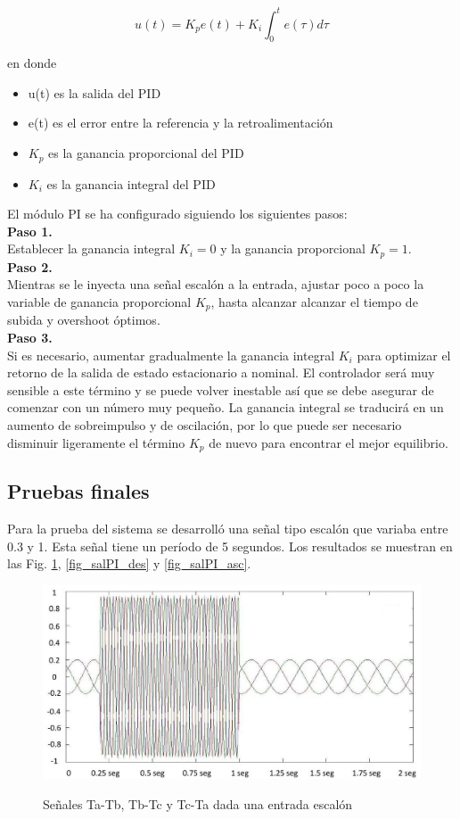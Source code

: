\documentclass[conference]{IEEEtran}
\begin{document}
\begin{equation}
u(t)=K_pe(t)+K_i\int_0^te(\tau)d\tau  \label{eq-cuatro}
\end{equation}


en donde 
\begin{itemize}
	\item u(t) es la salida del PID
	\item e(t) es el error entre la referencia y la retroalimentación
	\item  $ K_p $ es la ganancia proporcional del PID
	\item $ K_i $ es la ganancia integral del PID
\end{itemize}

El módulo PI se ha configurado siguiendo los siguientes pasos:\\
\textbf{Paso 1.}\\
Establecer la ganancia integral $ K_i = 0 $  y la ganancia proporcional $ K_p = 1 $.\\
\textbf{Paso 2.}\\
Mientras se le inyecta una señal escalón a la entrada, ajustar poco a poco  la variable de ganancia proporcional $ K_p $, hasta alcanzar alcanzar el tiempo de subida y overshoot óptimos.\\
\textbf{Paso 3.}\\
Si es necesario, aumentar gradualmente la ganancia integral $ K_i $ para optimizar el retorno de la salida de estado estacionario a nominal. El controlador será muy sensible a este término y se puede volver inestable así que se debe asegurar de comenzar con un número muy pequeño. La ganancia integral se traducirá en un aumento de sobreimpulso y de oscilación, por lo que puede ser necesario disminuir ligeramente el término $ K_p $ de nuevo para encontrar el mejor equilibrio. 


\subsection{Pruebas finales}

Para la prueba del sistema se desarrolló una señal tipo escalón que variaba entre 0.3 y 1. Esta señal tiene un período de 5 segundos. Los resultados se muestran en las Fig. \ref{fig_entEsc}, \ref{fig_salPI_des} y \ref{fig_salPI_asc}.

\begin{figure}[!t]
\centering
\includegraphics[width=8 cm]{figuras/figura_21.jpeg} \\
\caption{Señales Ta-Tb, Tb-Tc y Tc-Ta dada una entrada escalón} 
\label{fig_entEsc}
\end{figure}
 
\end{document}
